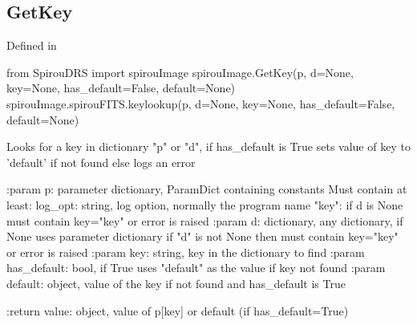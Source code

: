 
\noindent\begin{minipage}{\textwidth}
\subsection{GetKey}

Defined in \spirouImage{}

\begin{pythonbox}
from SpirouDRS import spirouImage
spirouImage.GetKey(p, d=None, key=None, has_default=False, default=None)
spirouImage.spirouFITS.keylookup(p, d=None, key=None, has_default=False, default=None)
\end{pythonbox}

\begin{pythondocstring}
Looks for a key in dictionary "p" or "d", if has_default is True sets
value of key to 'default' if not found else logs an error

:param p: parameter dictionary, ParamDict containing constants
    Must contain at least:
            log_opt: string, log option, normally the program name
            "key": if d is None must contain key="key" or error is raised
:param d: dictionary, any dictionary, if None uses parameter dictionary
          if "d" is not None then must contain key="key" or error is raised
:param key: string, key in the dictionary to find
:param has_default: bool, if True uses "default" as the value if key
                    not found
:param default: object, value of the key if not found and
                has_default is True

:return value: object, value of p[key] or default (if has_default=True)
\end{pythondocstring}
\end{minipage}


